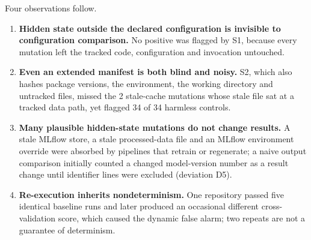 Four observations follow.
\begin{enumerate}
  \item \textbf{Hidden state outside the declared configuration is invisible to configuration comparison.} No positive was flagged by S1, because every mutation left the tracked code, configuration and invocation untouched.
  \item \textbf{Even an extended manifest is both blind and noisy.} S2, which also hashes package versions, the environment, the working directory and untracked files, missed the 2 stale-cache mutations whose stale file sat at a tracked data path, yet flagged 34 of 34 harmless controls.
  \item \textbf{Many plausible hidden-state mutations do not change results.} A stale MLflow store, a stale processed-data file and an MLflow environment override were absorbed by pipelines that retrain or regenerate; a naive output comparison initially counted a changed model-version number as a result change until identifier lines were excluded (deviation D5).
  \item \textbf{Re-execution inherits nondeterminism.} One repository passed five identical baseline runs and later produced an occasional different cross-validation score, which caused the dynamic false alarm; two repeats are not a guarantee of determinism.
\end{enumerate}
